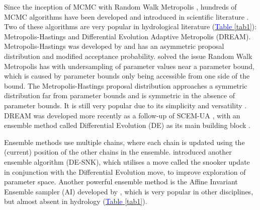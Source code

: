 Since the inception of MCMC with Random Walk Metropolis \citep{metropolis1953equation}, hundreds of MCMC algorithms have been developed and introduced in scientific literature \citep{brooks2011handbook}. Two of these algorithms are very popular in hydrological literature (\hyperref[tab1]{\textcolor{blue}{Table} \ref*{tab1}}): Metropolis-Hastings and Differential Evolution Adaptive Metropolis (DREAM). Metropolis-Hastings was developed by \cite{hastings1970monte} and has an asymmetric proposal distribution and modified acceptance probability. \cite{hastings1970monte} solved the issue Random Walk Metropolis has with undersampling of parameter values near a parameter bound, which is caused by parameter bounds only being accessible from one side of the bound. The Metropolis-Hastings proposal distribution approaches a symmetric distribution far from parameter bounds and is symmetric in the absence of parameter bounds. It is still very popular due to its simplicity and versatility \citep{robert2004metropolis}. DREAM was developed more recently \citep{vrugt2009accelerating} as a follow-up of SCEM-UA \citep{vrugt2003shuffled}, with an ensemble method called Differential Evolution (DE) as its main building block \citep{terbraak2006markov}. 

Ensemble methods use multiple chains, where each chain is updated using the (current) position of the other chains in the ensemble. \cite{terbraak2008differential} introduced another ensemble algorithm (DE-SNK), which utilises a move called the snooker update in conjunction with the Differential Evolution move, to improve exploration of parameter space. Another powerful ensemble method is the Affine Invariant Ensemble sampler (AI) developed by \cite{goodman2010ensemble}, which is very popular in other disciplines, but almost absent in hydrology (\hyperref[tab1]{\textcolor{blue}{Table} \ref*{tab1}}).

